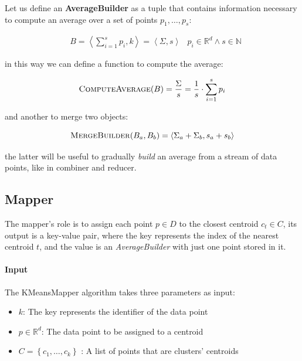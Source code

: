 \documentclass[parskip=full]{report}
\begin{document}
Let us define an \textbf{AverageBuilder} as a tuple that contains information 
necessary to compute an average over a set of points ${p_1, \dots, p_s}$:

\begin{align}
	\label{def:avgBuild}
& B = \left\langle \sum_{i = 1}^{s} p_i, k\right\rangle =
\left\langle \Sigma, s\right\rangle
&
p_i \in \mathbb{R}^d \land s \in \mathbb{N}
\end{align}

in this way we can define a function to compute the average:

\begin{equation}
\label{computeAvg}
\text{\textsc{ComputeAverage}}(B) = \dfrac{\Sigma}{s}
= \dfrac{1}{s}\cdot\sum_{i = 1}^{s} p_i
\end{equation}

and another to merge two objects:

\begin{equation}
\label{mergeAvg}
\text{\textsc{MergeBuilder}}(B_a, B_b) =
\left\langle \Sigma_a + \Sigma_b, s_a + s_b\right\rangle
\end{equation}

the latter will be useful to gradually \textit{build} an average from a stream 
of 
data points, like in combiner and reducer.

\subsection{Mapper}
The mapper's role is to assign each point $p \in D$ to the closest centroid 
$c_t \in C$, its output is a key-value pair, where the key represents the 
index of the nearest centroid $t$, and the value is an \emph{AverageBuilder} 
with just one point stored in it.

\paragraph{Input}
The KMeansMapper algorithm takes three parameters as input:

\begin{itemize}
	\item $k$: The key represents the identifier of the data point
	\item $p \in \mathbb{R}^d$: The data point to be assigned to a centroid
	\item $C = \left\{c_1, \dots, c_k\right\}$ : A list of points that are 
	clusters' centroids
\end{itemize}
\end{document}
